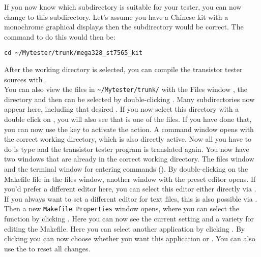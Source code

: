 If you now know which subdirectory is suitable for your tester,
you can now change to this subdirectory.
Let's assume you have a Chinese kit with a monochrome graphical display,s
then the subdirectory  would be correct.
The command to do this would then be:
\begin{large} \vspace{-0.4em} \begin{verbatim}
cd ~/Mytester/trunk/mega328_st7565_kit
\end{verbatim} \end{large}
After the working directory is selected, you can compile the
transistor tester sources with .\\

You can also view the files in \verb"~/Mytester/trunk/" with the Files window , the directory  and then
 can be selected by double-clicking \LMB.
Many subdirectories now appear here, including that desired .
If you now select this directory with a double click on \LMB,
you will also see that  is one of the files.
If you have done that, you can now use the \RMB key to activate the  action.
A command window opens with the correct working directory, which is also directly active.
Now all you have to do is type  and 
the transistor tester program is translated again.
You now have two windows that are already in the correct working directory.
The files window and the terminal window for entering commands ().
By double-clicking \LMB on the Makefile file in the files window,
another window with the preset editor opens.
If you'd prefer a different editor here, you can select this editor either
directly via \RMB {}.
If you always want to set a different editor for text files,
this is also possible via \RMB {}.
Then a new \verb"Makefile Properties" window opens, where you can select the
function  by clicking \RMB.
Here you can now see the current setting and a variety for editing the Makefile.
Here you can select another application by clicking \LMB.
By clicking \LMB you can now choose whether you want this
application  or .
You can also use the  to reset all changes. 

